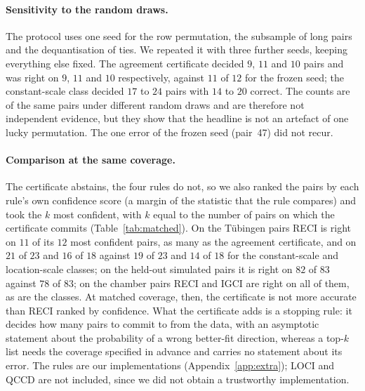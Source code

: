 \paragraph{Sensitivity to the random draws.} The protocol uses one seed for the
row permutation, the subsample of long pairs and the dequantisation of ties. We
repeated it with three further seeds, keeping everything else
fixed. The agreement certificate decided $9$, $11$ and $10$ pairs and was right
on $9$, $11$ and $10$ respectively, against $11$ of $12$ for the frozen seed; the
constant-scale class decided $17$ to $24$ pairs with $14$ to $20$ correct. The
counts are of the same pairs under different random draws and are therefore not
independent evidence, but they show that the headline is not an artefact of one
lucky permutation. The one error of the frozen seed (pair~47) did not recur.

\paragraph{Comparison at the same coverage.} The certificate abstains, the four rules
do not, so we also ranked the pairs by each rule's own confidence score (a margin of
the statistic that the rule compares) and took the $k$ most confident, with $k$ equal
to the number of pairs on which the certificate commits (Table~\ref{tab:matched}). On the Tübingen pairs
RECI is right on $11$ of its $12$ most confident pairs, as many as the agreement
certificate, and on $21$ of $23$ and $16$ of $18$ against $19$ of $23$ and $14$ of
$18$ for the constant-scale and location-scale classes; on the held-out simulated
pairs it is right on $82$ of $83$ against $78$ of $83$; on the chamber pairs RECI and
IGCI are right on all of them, as are the classes. At matched coverage, then, the
certificate is not more accurate than RECI ranked by confidence. What the
certificate adds is a stopping rule: it decides how many pairs to commit to from the
data, with an asymptotic statement about the probability of a wrong
better-fit direction, whereas a top-$k$ list needs the coverage specified in advance and
carries no statement about its error. The rules are our implementations
(Appendix~\ref{app:extra}); LOCI and QCCD \citep{immer2023loci,tagasovska2020bqcd} are not
included, since we did not obtain a trustworthy implementation.

